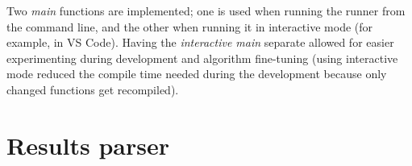 Two \textit{main} functions are implemented; one is used when running the runner from the command line, and the other when running it in interactive mode (for example, in VS Code). Having the \textit{interactive main} separate allowed for easier experimenting during development and algorithm fine-tuning (using interactive mode reduced the compile time needed during the development because only changed functions get recompiled).

\section{Results parser}